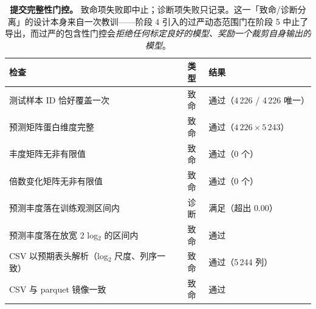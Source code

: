 \begin{table}[H]
\centering\small
\caption{\textbf{提交完整性门控。} 致命项失败即中止；诊断项失败只记录。这一「致命/诊断分离」的设计本身来自一次教训——阶段 4 引入的过严动态范围门在阶段 5 中止了导出，而过严的包含性门控会\emph{拒绝任何标定良好的模型、奖励一个裁剪自身输出的模型}。}
\label{tab:gates}
\begin{tabular}{@{}p{8.8cm}cp{4.6cm}@{}}
\toprule
检查 & 类型 & 结果 \\
\midrule
测试样本 ID 恰好覆盖一次 & 致命 & 通过（4\,226 / 4\,226 唯一） \\
预测矩阵蛋白维度完整 & 致命 & 通过（$4\,226\times5\,243$） \\
丰度矩阵无非有限值 & 致命 & 通过（0 个） \\
倍数变化矩阵无非有限值 & 致命 & 通过（0 个） \\
预测丰度落在训练观测区间内 & 诊断 & 满足（超出 0.00） \\
预测丰度落在放宽 2 log$_2$ 的区间内 & 致命 & 通过 \\
CSV 以预期表头解析（log$_2$ 尺度、列序一致） & 致命 & 通过（5\,244 列） \\
CSV 与 parquet 镜像一致 & 致命 & 通过 \\
\bottomrule
\end{tabular}
\end{table}
